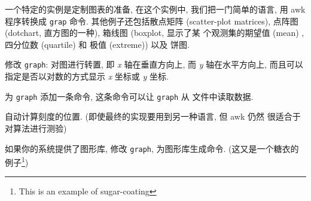 一个特定的实例是定制图表的准备, 在这个实例中, 我们把一门简单的语言, 用
awk 程序转换成 \texttt{grap} 命令. 其他例子还包括散点矩阵 (scatter-plot
matrices), 点阵图 (dotchart, 直方图的一种), 箱线图 (boxplot, 显示了某
个观测集的期望值 (mean) , 四分位数 (quartile) 和 极值 (extreme)) 以及
饼图.

\begin{exercise}
    修改 \texttt{graph}: 对图进行转置, 即 \textit{x} 轴在垂直方向上,
    而 \textit{y} 轴在水平方向上, 而且可以指定是否以对数的方式显示
    \textit{x} 坐标或 \textit{y} 坐标.
\end{exercise}

\begin{exercise}
    为 \texttt{graph} 添加一条命令, 这条命令可以让 \texttt{graph} 从
    文件中读取数据.
\end{exercise}

\begin{exercise}
    自动计算刻度的位置. (即使最终的实现要用到另一种语言, 但 awk 仍然
    很适合于对算法进行测验)
\end{exercise}

\begin{exercise}
    如果你的系统提供了图形库, 修改 \texttt{graph}, 为图形库生成命令.
    (这又是一个糖衣的例子\footnote{This is an example of sugar-coating})
\end{exercise}

